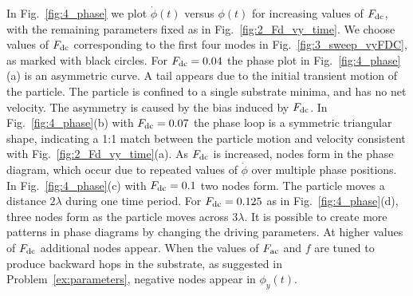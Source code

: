\documentclass[preprint,showpacs,preprintnumbers,amsmath,amssymb,aps,prb]{revtex4-1}
\theoremstyle{remark}
\begin{document}
  In Fig.~\ref{fig:4_phase}
  we plot $\dot{\phi}(t)$ versus $\phi(t)$
  for increasing values of
  $F_{\rm dc}$, 
  with the remaining parameters fixed as in Fig.~\ref{fig:2_Fd_vy_time}.
  We choose values of $F_{\rm dc}$
  corresponding to the first four modes in
  Fig.~\ref{fig:3_sweep_vyFDC},
  as marked with black circles.
  For
  $F_{\rm dc} = 0.04$
  the phase plot   in Fig.~\ref{fig:4_phase}(a)  is an
  asymmetric curve.
  A tail appears
  due to the initial transient
  motion of the particle.
  The particle is confined to a single
  substrate minima,
  and has no net velocity.
  The asymmetry is caused by the bias induced by $F_{\rm dc}$.
  In Fig.~\ref{fig:4_phase}(b)
  with $F_{\rm dc} = 0.07$
  the phase loop is a symmetric triangular shape,
  indicating a 1:1 match between the
  particle motion and velocity consistent with 
  Fig.~\ref{fig:2_Fd_vy_time}(a).
  As $F_{\rm dc}$ is
  increased,
  nodes form in the phase diagram, which occur
  due to repeated values
  of $\dot{\phi}$ over multiple phase positions.
  In Fig.~\ref{fig:4_phase}(c)
  with $F_{\rm dc} = 0.1$
  two nodes form.
  The particle moves a distance $2\lambda$
  during one time period.
For $F_{\rm dc} = 0.125$ as in Fig.~\ref{fig:4_phase}(d),
three nodes form as the particle moves across $3\lambda$.
It is possible to create
more patterns in phase diagrams 
by changing the driving parameters.
At higher values of $F_{\rm dc}$
additional nodes appear.
When the values of $F_{\rm ac}$ and $f$
are tuned to produce backward hops in the substrate,
as suggested in Problem~\ref{ex:parameters}, 
negative nodes appear in $\phi_y(t)$.
  
\end{document}
